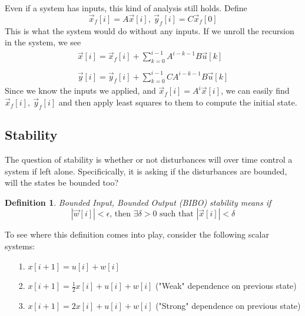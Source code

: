 \documentclass{article}
\newtheorem{definition}{Definition}
\begin{document}
Even if a system has inputs, this kind of analysis still holds.
Define 
$$\vec{x}_f[i]=A\vec{x}[i],\ \vec{y}_f[i]=C\vec{x}_f[0]$$
This is what the system would do without any inputs. If we unroll the recursion in the system, we see
\[
    \begin{array}{c}
        \vec{x}[i] = \vec{x}_f[i]+\sum_{k=0}^{i-1}{A^{i-k-1}B\vec{u}[k]}\\\\
        \vec{y}[i] = \vec{y}_f[i]+\sum_{k=0}^{i-1}{CA^{i-k-1}B\vec{u}[k]}
    \end{array}
\]
Since we know the inputs we applied, and $\vec{x}_f[i]=A^i\vec{x}[i]$, we can easily find $\vec{x}_f[i],\ \vec{y}_f[i]$
and then apply least squares to them to compute the initial state.

\subsection{Stability}
The question of stability is whether or not disturbances will over time control a system if left alone.
Specificically, it is asking if the disturbances are bounded, will the states be bounded too?
\begin{definition}
    Bounded Input, Bounded Output (BIBO) stability means if
    $$|\vec{w}[i]| < \epsilon\text{, then }\exists \delta>0\text{ such that }|\vec{x}[i]| < \delta$$
\end{definition}
To see where this definition comes into play, consider the following scalar systems:
\begin{itemize}
    \item[1.] $x[i+1] = u[i] + w[i]$
    \item[2.] $x[i+1] = \frac{1}{2}x[i] + u[i]+w[i]$ ("Weak" dependence on previous state)
    \item[3.] $x[i+1] = 2 x[i]+u[i]+w[i]$ ("Strong" dependence on previous state)
\end{itemize}
\end{document}

